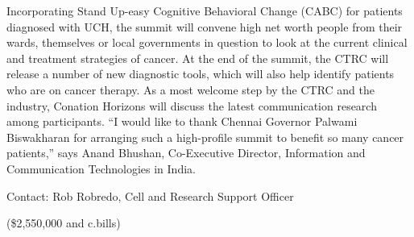 \documentclass{article}
\begin{document}
Incorporating Stand Up-easy Cognitive Behavioral Change (CABC) for patients diagnosed with UCH, the summit will convene high net worth people from their wards, themselves or local governments in question to look at the current clinical and treatment strategies of cancer. At the end of the summit, the CTRC will release a number of new diagnostic tools, which will also help identify patients who are on cancer therapy. As a most welcome step by the CTRC and the industry, Conation Horizons will discuss the latest communication research among participants. “I would like to thank Chennai Governor Palwami Biswakharan for arranging such a high-profile summit to benefit so many cancer patients,” says Anand Bhushan, Co-Executive Director, Information and Communication Technologies in India.

Contact: Rob Robredo, Cell and Research Support Officer

(\$2,550,000 and c.bills)
\end{document}
